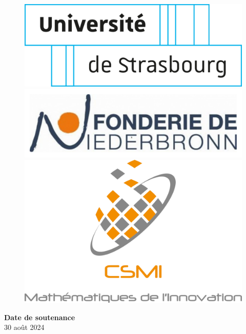 \documentclass[12pt]{article}
\begin{document}
\begin{titlepage}
    \begin{figure}[b!]
    \centering
    \vfill
    \includegraphics[scale=0.16]{Images/Presentation/logo-unistra.pdf}
    \hspace{0.5 cm}
    \includegraphics[scale=0.16]{Images/Presentation/logo-Fonderie.pdf}
    \hspace{0.5 cm}
    \includegraphics[scale=0.16]{Images/Presentation/logoCSMI.pdf}
    \end{figure}
    
    {\large \textbf{Date de soutenance }} \\
    {\large 30 août 2024} \\[1cm]
    
\end{titlepage}
\end{document}
